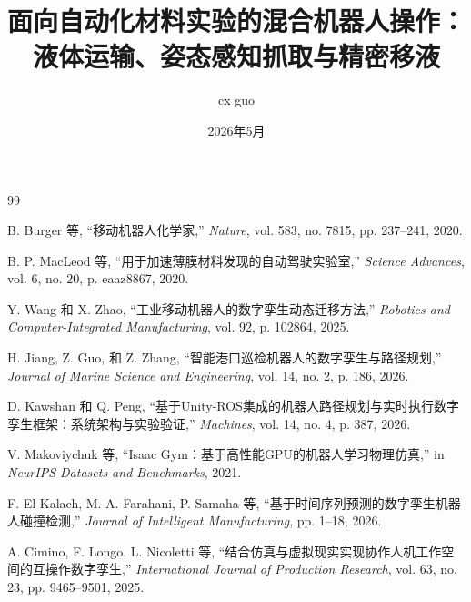 \documentclass[journal,twocolumn]{IEEEtran}
\begin{document}
\title{面向自动化材料实验的混合机器人操作：液体运输、姿态感知抓取与精密移液}
\author{cx guo}
\date{2026年5月}

\maketitle









\begin{thebibliography}{99}

B. Burger 等, ``移动机器人化学家,'' \textit{Nature}, vol. 583, no. 7815, pp. 237--241, 2020.

B. P. MacLeod 等, ``用于加速薄膜材料发现的自动驾驶实验室,'' \textit{Science Advances}, vol. 6, no. 20, p. eaaz8867, 2020.

Y. Wang 和 X. Zhao, ``工业移动机器人的数字孪生动态迁移方法,'' \textit{Robotics and Computer-Integrated Manufacturing}, vol. 92, p. 102864, 2025.

H. Jiang, Z. Guo, 和 Z. Zhang, ``智能港口巡检机器人的数字孪生与路径规划,'' \textit{Journal of Marine Science and Engineering}, vol. 14, no. 2, p. 186, 2026.

D. Kawshan 和 Q. Peng, ``基于Unity-ROS集成的机器人路径规划与实时执行数字孪生框架：系统架构与实验验证,'' \textit{Machines}, vol. 14, no. 4, p. 387, 2026.

V. Makoviychuk 等, ``Isaac Gym：基于高性能GPU的机器人学习物理仿真,'' in \textit{NeurIPS Datasets and Benchmarks}, 2021.

F. El Kalach, M. A. Farahani, P. Samaha 等, ``基于时间序列预测的数字孪生机器人碰撞检测,'' \textit{Journal of Intelligent Manufacturing}, pp. 1--18, 2026.

A. Cimino, F. Longo, L. Nicoletti 等, ``结合仿真与虚拟现实实现协作人机工作空间的互操作数字孪生,'' \textit{International Journal of Production Research}, vol. 63, no. 23, pp. 9465--9501, 2025.


\end{thebibliography}
\end{document}
